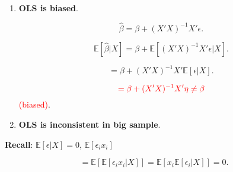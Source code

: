 \documentclass[12pt, oneside]{article}
\begin{document}
\begin{enumerate}
        \item \textbf{OLS is biased}. 
        
        \[
        \hat{\beta} = \beta + (X'X)^{-1} X' \epsilon.
        \]

        \[
        \mathbb{E}[\hat{\beta} | X] = \beta + \mathbb{E}[(X'X)^{-1} X' \epsilon | X].
        \]

        \[
        = \beta + (X'X)^{-1} X' \mathbb{E}[\epsilon | X].
        \]

        \[
        \textcolor{red}{= \beta + (X'X)^{-1} X' \eta \neq \beta}
        \] 
        \textcolor{red}{(biased)}.
        \item \textbf{OLS is inconsistent in big sample}.
    \end{enumerate}

\textbf{Recall}: \( \mathbb{E}[\epsilon | X] = 0 \), \quad \( \mathbb{E}[\epsilon_i x_i] \)

\[
= \mathbb{E} \left[ \mathbb{E}[\epsilon_i x_i | X] \right] = \mathbb{E} \left[ x_i \mathbb{E}[\epsilon_i | X] \right] = 0.
\]

\noindent\hrulefill
\end{document}
